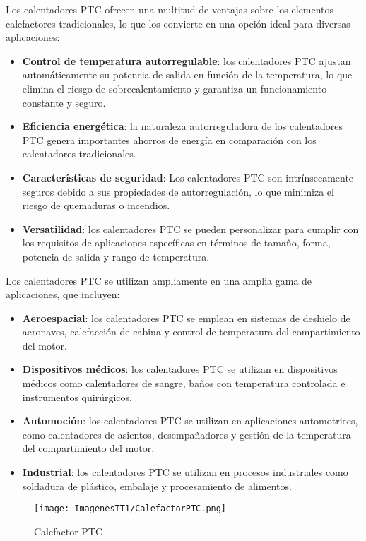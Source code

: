 \documentclass[14pt,oneside]{extarticle} %
\begin{document}
Los calentadores PTC ofrecen una multitud de ventajas sobre los elementos calefactores tradicionales, lo que los convierte en una opción ideal para diversas aplicaciones:

\begin{itemize}
    \item \textbf{Control de temperatura autorregulable}: los calentadores PTC ajustan automáticamente su potencia de salida en función de la temperatura, lo que elimina el riesgo de sobrecalentamiento y garantiza un funcionamiento constante y seguro.
    \item \textbf{Eficiencia energética}: la naturaleza autorreguladora de los calentadores PTC genera importantes ahorros de energía en comparación con los calentadores tradicionales.
    \item \textbf{Características de seguridad}: Los calentadores PTC son intrínsecamente seguros debido a sus propiedades de autorregulación, lo que minimiza el riesgo de quemaduras o incendios.
    \item \textbf{Versatilidad}: los calentadores PTC se pueden personalizar para cumplir con los requisitos de aplicaciones específicas en términos de tamaño, forma, potencia de salida y rango de temperatura.
\end{itemize}

Los calentadores PTC se utilizan ampliamente en una amplia gama de aplicaciones, que incluyen:
\begin{itemize}
    \item \textbf{Aeroespacial}: los calentadores PTC se emplean en sistemas de deshielo de aeronaves, calefacción de cabina y control de temperatura del compartimiento del motor.
    \item \textbf{Dispositivos médicos}: los calentadores PTC se utilizan en dispositivos médicos como calentadores de sangre, baños con temperatura controlada e instrumentos quirúrgicos.
    \item \textbf{Automoción}: los calentadores PTC se utilizan en aplicaciones automotrices, como calentadores de asientos, desempañadores y gestión de la temperatura del compartimiento del motor.
    \item \textbf{Industrial}: los calentadores PTC se utilizan en procesos industriales como soldadura de plástico, embalaje y procesamiento de alimentos.
\end{itemize}

\begin{figure}[H]
    \centering
    \texttt{[image: ImagenesTT1/CalefactorPTC.png]}
    \caption{Calefactor PTC}
    \label{fig:CalefactorPTC}
\end{figure}
\end{document}
